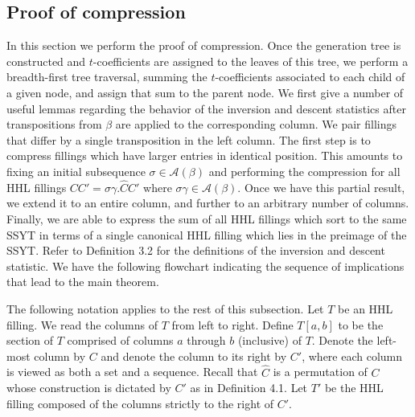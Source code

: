 \documentclass[11pt]{amsart}
\begin{document}
{\subsection{Proof of compression}
In this section we perform the proof of compression. Once the generation tree is constructed and $t$-coefficients are assigned to the leaves of this tree, we perform a breadth-first tree traversal, summing the $t$-coefficients associated to each child of a given node, and assign that sum to the parent node. 
\newline\indent We first give a number of useful lemmas regarding the behavior of the inversion and descent statistics after transpositions from $\beta$ are applied to the corresponding column. We pair fillings that differ by a single transposition in the left column. The first step is to compress fillings which have larger entries in identical position. This amounts to fixing an initial subsequence $\sigma\in\mathcal{A}(\beta)$ and performing the compression for all HHL fillings $CC'=\sigma\gamma.\widehat{C}C'$ where $\sigma\gamma \in \mathcal{A}(\beta)$. Once we have this partial result, we extend it to an entire column, and further to an arbitrary number of columns. Finally, we are able to express the sum of all HHL fillings which sort to the same SSYT in terms of a single canonical HHL filling which lies in the preimage of the SSYT. 
\newline\indent Refer to Definition 3.2 for the definitions of the inversion and descent statistic. We have the following flowchart indicating the sequence of implications that lead to the main theorem. 
\newline\indent The following notation applies to the rest of this subsection. Let $T$ be an HHL filling. We read the columns of $T$ from left to right. Define $T[a,b]$ to be the section of $T$ comprised of columns $a$ through $b$ (inclusive) of $T$. Denote the left-most column by $C$ and denote the column to its right by $C'$, where each column is viewed as both a set and a sequence. Recall that $\widehat{C}$ is a permutation of $C$ whose construction is dictated by $C'$ as in Definition 4.1. Let $T'$ be the HHL filling composed of the columns strictly to the right of $C'$. 
}
\end{document}
